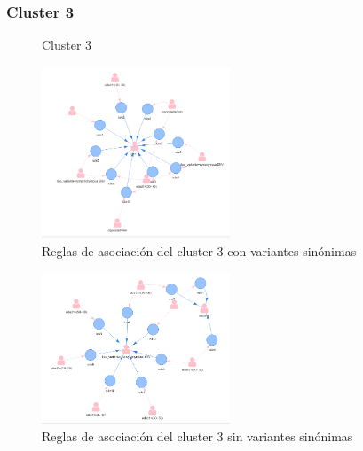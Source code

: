 \subsubsection*{Cluster 3}

\begin{figure}[H]
	\centering
	\caption{Cluster 3} \label{fig:c3}
\end{figure}

\begin{figure}[H]
	\centering
	\includegraphics[width=0.5\textwidth]{Kap4/reglas3_1}
	\caption{Reglas de asociación del cluster 3 con variantes sinónimas} \label{fig:r3}
\end{figure}

\begin{figure}[H]
	\centering
	\includegraphics[width=0.5\textwidth]{Kap4/reglas3_2}
	\caption{Reglas de asociación del cluster 3 sin variantes sinónimas} \label{fig:r23}
\end{figure}

